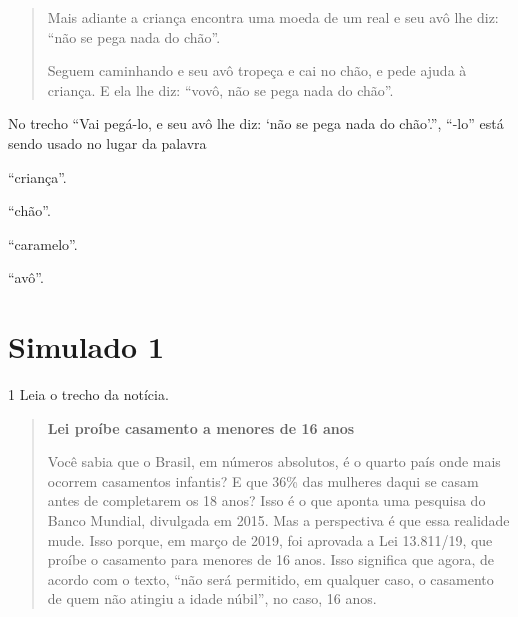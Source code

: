 \begin{escolha}
\begin{escolha}
\begin{quote}
Mais adiante a criança encontra uma moeda de um real e seu avô lhe diz:
``não se pega nada do chão''.

Seguem caminhando e seu avô tropeça e cai no chão, e pede ajuda à
criança. E ela lhe diz: ``vovô, não se pega nada do chão''.
\end{quote}


No trecho ``Vai pegá-lo, e seu avô lhe diz: `não se pega nada do
chão'.'', ``-lo'' está sendo usado no lugar da palavra

\begin{escolha}
\item ``criança''.

\item ``chão''.

\item ``caramelo''.

\item ``avô''.
\end{escolha}


\chapter{Simulado 1}

\num{1} Leia o trecho da notícia.

\begin{quote}
\textbf{Lei proíbe casamento a menores de 16 anos}

Você sabia que o Brasil, em números absolutos, é o quarto país onde mais
ocorrem casamentos infantis? E que 36\% das mulheres daqui se casam
antes de completarem os 18 anos? Isso é o que aponta uma pesquisa do
Banco Mundial, divulgada em 2015. Mas a perspectiva é que essa realidade
mude. Isso porque, em março de 2019, foi aprovada a Lei 13.811/19, que
proíbe o casamento para menores de 16 anos. Isso significa que agora, de
acordo com o texto, ``não será permitido, em qualquer caso, o casamento
de quem não atingiu a idade núbil'', no caso, 16 anos.


\end{quote}
\end{escolha}
\end{escolha}
